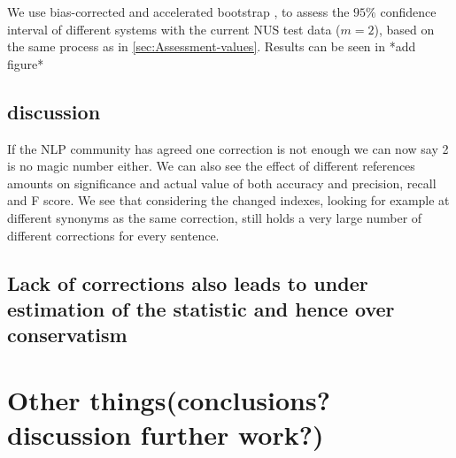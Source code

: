 \documentclass[english]{article}
\begin{document}
We use bias-corrected and accelerated bootstrap \cite{efron1987better}, to assess the $95\%$ confidence interval of different systems with the current NUS test data ($m=2$), based on the same process as in \ref{sec:Assessment-values}. Results can be seen in {*}add figure{*}

\subsection{discussion}

If the NLP community has agreed one correction is not enough\cite{tetreault2008native}
we can now say 2 is no magic number either. We can also see the effect of different references amounts on significance and actual value of both accuracy and precision, recall and F score.
We see that considering the changed indexes, looking for example at different synonyms as the same correction, still holds a very large number of different corrections for every sentence.


\subsection{Lack of corrections also leads to under estimation of the statistic
and hence over conservatism}

\section{Other things(conclusions? discussion further work?)}



\end{document}
